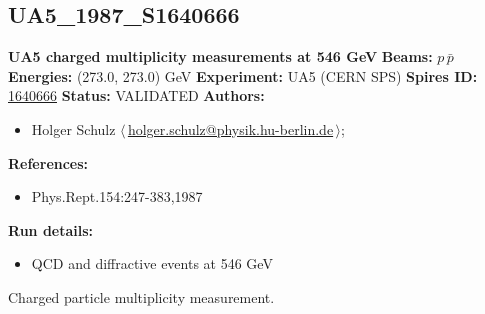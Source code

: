 \clearpage


\clearpage

\subsection[UA5\_1987\_S1640666]{UA5\_1987\_S1640666\,\cite{Alner:1987wb}}
\textbf{UA5 charged multiplicity measurements at 546 GeV}\newline
\textbf{Beams:} $p$\,$\bar{p}$ \newline
\textbf{Energies:} (273.0, 273.0) GeV \newline
\textbf{Experiment:} UA5 (CERN SPS) \newline
\textbf{Spires ID:} \href{http://www.slac.stanford.edu/spires/find/hep/www?rawcmd=key+1640666}{1640666}\newline
\textbf{Status:} VALIDATED\newline
\textbf{Authors:}
\begin{itemize}
  \item Holger Schulz $\langle\,$\href{mailto:holger.schulz@physik.hu-berlin.de}{holger.schulz@physik.hu-berlin.de}$\,\rangle$;
\end{itemize}
\textbf{References:}
\begin{itemize}
  \item Phys.Rept.154:247-383,1987
\end{itemize}
\textbf{Run details:}
\begin{itemize}

  \item QCD and diffractive events at 546 GeV\end{itemize}

\noindent Charged particle multiplicity measurement.

\clearpage


\clearpage

